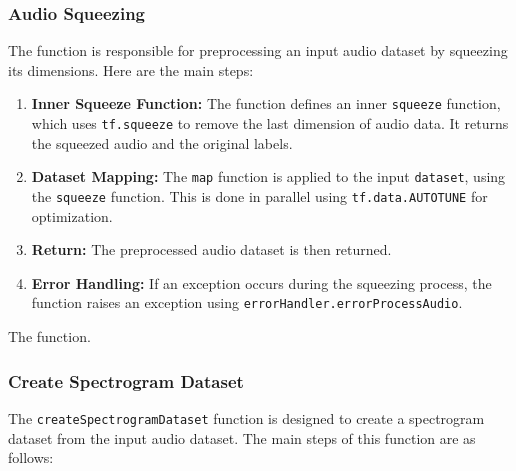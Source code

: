 \subsubsection{Audio Squeezing}


The  function is responsible for preprocessing an input audio dataset by squeezing its dimensions. Here are the main steps:

\begin{enumerate}
	\item \textbf{Inner Squeeze Function:} The function defines an inner \texttt{squeeze} function, which uses \texttt{tf.squeeze} to remove the last dimension of audio data. It returns the squeezed audio and the original labels.
	
	\item \textbf{Dataset Mapping:} The \texttt{map} function is applied to the input \texttt{dataset}, using the \texttt{squeeze} function. This is done in parallel using \texttt{tf.data.AUTOTUNE} for optimization.
	
	\item \textbf{Return:} The preprocessed audio dataset is then returned.
	
	\item \textbf{Error Handling:} If an exception occurs during the squeezing process, the function raises an exception using \texttt{errorHandler.errorProcessAudio}.
\end{enumerate}



\begin{code}[h!]
	    
	
	\caption{The  function.}
	\label{code:preprocessAudioDataset}
\end{code}

\subsubsection{Create Spectrogram Dataset}

The \texttt{createSpectrogramDataset} function is designed to create a spectrogram dataset from the input audio dataset. The main steps of this function are as follows:

